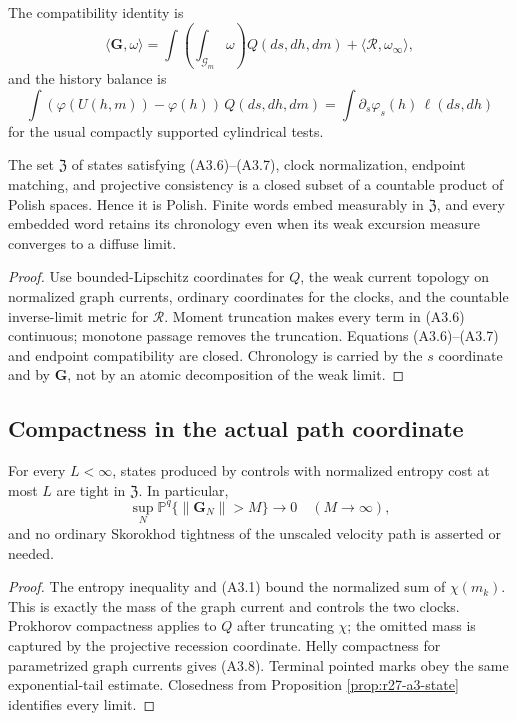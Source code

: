 The compatibility identity is
\[
 \langle\mathbf G,\omega\rangle
 =\int\!\left(\int_{\mathcal G_m}\omega\right)
       Q(ds,dh,dm)+\langle\mathcal R,\omega_\infty\rangle,               \tag{A3.6}
\]
and the history balance is
\[
 \int(\varphi(U(h,m))-\varphi(h))\,Q(ds,dh,dm)
 =\int\partial_s\varphi_s(h)\,\ell(ds,dh)                \tag{A3.7}
\]
for the usual compactly supported cylindrical tests.

\begin{proposition}
\label{prop:r27-a3-state}
The set $\mathfrak Z$ of states satisfying (A3.6)--(A3.7), clock
normalization, endpoint matching, and projective consistency is a closed
subset of a countable product of Polish spaces.  Hence it is Polish.
Finite words embed measurably in $\mathfrak Z$, and every embedded word
retains its chronology even when its weak excursion measure converges to a
diffuse limit.
\end{proposition}

\begin{proof}
Use bounded-Lipschitz coordinates for $Q$, the weak current topology on
normalized graph currents, ordinary coordinates for the clocks, and the
countable inverse-limit metric for $\mathcal R$.  Moment truncation makes every
term in (A3.6) continuous; monotone passage removes the truncation.
Equations (A3.6)--(A3.7) and endpoint compatibility are closed.  Chronology is
carried by the $s$ coordinate and by $\mathbf G$, not by an atomic
decomposition of the weak limit.
\end{proof}

\subsection{Compactness in the actual path coordinate}

\begin{lemma}
\label{lem:r27-a3-tight}
For every $L<\infty$, states produced by controls with normalized entropy cost
at most $L$ are tight in $\mathfrak Z$.  In particular,
\[
 \sup_N\mathbb P^q\{\|\mathbf G_N\|>M\}\longrightarrow0
 \quad(M\to\infty),                                      \tag{A3.8}
\]
and no ordinary Skorokhod tightness of the unscaled velocity path is asserted
or needed.
\end{lemma}

\begin{proof}
The entropy inequality and (A3.1) bound the normalized sum of $\chi(m_k)$.
This is exactly the mass of the graph current and controls the two clocks.
Prokhorov compactness applies to $Q$ after truncating $\chi$; the omitted
mass is captured by the projective recession coordinate.  Helly compactness
for parametrized graph currents gives (A3.8).  Terminal pointed marks obey the
same exponential-tail estimate.  Closedness from Proposition
\ref{prop:r27-a3-state} identifies every limit.
\end{proof}

